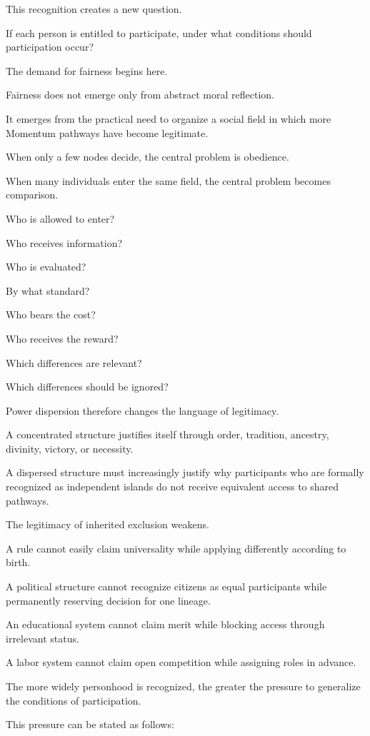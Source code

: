 This recognition creates a new question.

If each person is entitled to participate, under what conditions should participation occur?

The demand for fairness begins here.

Fairness does not emerge only from abstract moral reflection.

It emerges from the practical need to organize a social field in which more Momentum pathways have become legitimate.

When only a few nodes decide, the central problem is obedience.

When many individuals enter the same field, the central problem becomes comparison.

Who is allowed to enter?

Who receives information?

Who is evaluated?

By what standard?

Who bears the cost?

Who receives the reward?

Which differences are relevant?

Which differences should be ignored?

Power dispersion therefore changes the language of legitimacy.

A concentrated structure justifies itself through order, tradition, ancestry, divinity, victory, or necessity.

A dispersed structure must increasingly justify why participants who are formally recognized as independent islands do not receive equivalent access to shared pathways.

The legitimacy of inherited exclusion weakens.

A rule cannot easily claim universality while applying differently according to birth.

A political structure cannot recognize citizens as equal participants while permanently reserving decision for one lineage.

An educational system cannot claim merit while blocking access through irrelevant status.

A labor system cannot claim open competition while assigning roles in advance.

The more widely personhood is recognized, the greater the pressure to generalize the conditions of participation.

This pressure can be stated as follows:

